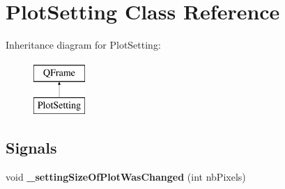 \hypertarget{class_plot_setting}{}\section{Plot\+Setting Class Reference}
\label{class_plot_setting}
Inheritance diagram for Plot\+Setting\+:\begin{figure}[H]
\begin{center}
\leavevmode
\includegraphics[height=2.000000cm]{class_plot_setting}
\end{center}
\end{figure}
\subsection*{Signals}
\begin{DoxyCompactItemize}
\item 
\mbox{\label{class_plot_setting_a35a6bd3ff3facfbfea5a6f15eb3dc15a}} 
void {\bfseries \+\_\+setting\+Size\+Of\+Plot\+Was\+Changed} (int nb\+Pixels)
\end{DoxyCompactItemize}
